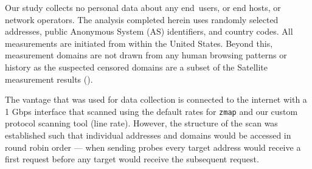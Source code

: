 Our study collects no personal data about any end~users, or end hosts, or
network operators. The analysis completed herein uses randomly selected
addresses, public Anonymous System (AS) identifiers, and country codes.  All
measurements are initiated from within the United States.
Beyond this,
measurement domains are not drawn from any human browsing patterns or history
as the suspected censored domains are a subset of the Satellite measurement
results (\cf {}).

The vantage that was used for data collection is connected to the internet with
a 1 Gbps interface that scanned using the default rates for {\tt zmap} and our
custom protocol scanning tool (line rate). However, the structure of the scan
was established such that individual addresses and domains would be accessed in
round robin order --- \ie when sending probes every target address would
receive a first request before any target would receive the subsequent request.


